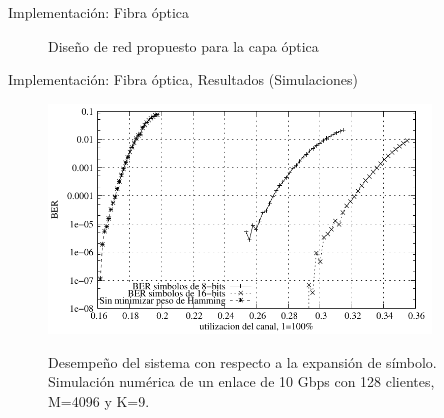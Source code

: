 \documentclass[aspectratio=169]{beamer}
\begin{document}

\begin{frame}{Implementación: Fibra óptica}

\begin{figure}[t]
  \centering
    \qquad
    
    Diseño de red propuesto para la capa óptica
    \label{arch:fig1}
\end{figure}

\end{frame}

\begin{frame}{Implementación: Fibra óptica, Resultados (Simulaciones)}

\begin{figure}[!t]
  \centering
    \includegraphics[width=4in]{../graphs/BERvsChannelES2}
    
    Desempeño del sistema con respecto a la expansión de símbolo. Simulación numérica de un enlace de 10 Gbps con 128 clientes, M=4096 y K=9.
    \label{BERvsExpansion}
\end{figure}

\end{frame}
\end{document}
